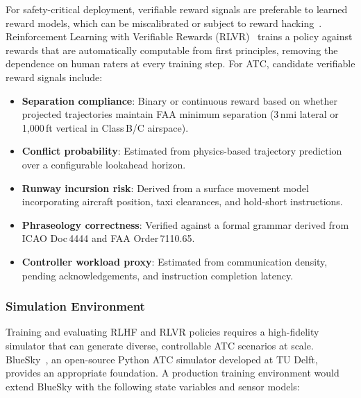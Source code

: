 \documentclass[11pt,a4paper]{article}
\begin{document}
For safety-critical deployment, verifiable reward signals are preferable to
learned reward models, which can be miscalibrated or subject to reward
hacking~\cite{skalse2022reward}. Reinforcement Learning with Verifiable
Rewards (RLVR)~\cite{lightman2023rlvr,guo2025deepseekr1} trains a policy
against rewards that are automatically computable from first principles,
removing the dependence on human raters at every training step. For ATC,
candidate verifiable reward signals include:

\begin{itemize}[noitemsep]
  \item \textbf{Separation compliance}: Binary or continuous reward based on
        whether projected trajectories maintain FAA minimum separation
        (3\,nmi lateral or 1,000\,ft vertical in Class\,B/C airspace).
  \item \textbf{Conflict probability}: Estimated from physics-based
        trajectory prediction over a configurable lookahead horizon.
  \item \textbf{Runway incursion risk}: Derived from a surface movement model
        incorporating aircraft position, taxi clearances, and hold-short
        instructions.
  \item \textbf{Phraseology correctness}: Verified against a formal grammar
        derived from ICAO Doc\,4444 and FAA Order\,7110.65.
  \item \textbf{Controller workload proxy}: Estimated from communication
        density, pending acknowledgements, and instruction completion latency.
\end{itemize}

\subsubsection{Simulation Environment}

Training and evaluating RLHF and RLVR policies requires a high-fidelity
simulator that can generate diverse, controllable ATC scenarios at scale.
BlueSky~\cite{hoekstra2016bluesky}, an open-source Python ATC simulator
developed at TU Delft, provides an appropriate foundation. A production
training environment would extend BlueSky with the following state variables
and sensor models:
\end{document}
